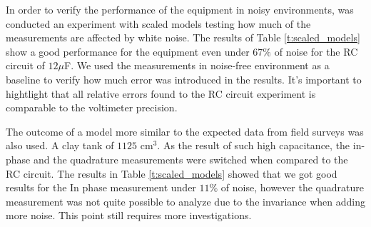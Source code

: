 \documentclass{vie16}
\begin{document}
In order to verify the performance of the equipment in noisy
environments, was conducted an experiment with scaled models testing
how much of the measurements are affected by white noise. The results
of Table \ref{t:scaled_models} show a good performance for the
equipment even under
$67\%$ of noise for the RC circuit of $12 \mu$F. We used the
measurements in noise-free environment as a baseline to verify how
much error was introduced in the results. It's important to
hightlight that all relative errors found to the RC circuit
experiment is comparable to the voltimeter precision.


The outcome of a model more similar to the expected data from field
surveys was also used. A clay tank of $1125$ cm$^3$. As the result of
such high capacitance, the in-phase and the quadrature measurements
were switched when compared to the RC circuit. The results in Table
\ref{t:scaled_models} showed that we got good results for the In phase
measurement under $11\%$ of noise, however the quadrature measurement
was not quite possible to analyze due to the invariance when adding
more noise. This point still requires more investigations.
\end{document}
